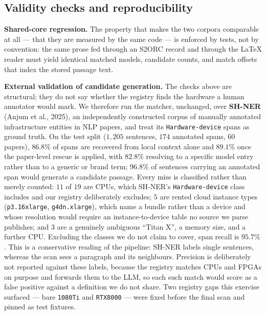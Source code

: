 \subsection{Validity checks and reproducibility}

\textbf{Shared-core regression.} The property that makes the two corpora
comparable at all --- that they are measured by the same code --- is enforced by
tests, not by convention: the same prose fed through an S2ORC record and through
the \LaTeX{} reader must yield identical matched models, candidate counts, and
match offsets that index the stored passage text.

\textbf{External validation of candidate generation.} The checks above are
structural; they do not say whether the registry finds the hardware a human
annotator would mark. We therefore run the matcher, unchanged, over
\textbf{SH-NER} (Anjum et al., 2025), an independently constructed corpus of
manually annotated infrastructure entities in NLP papers, and treat its
\texttt{Hardware-device} spans as ground truth. On the test split ($1{,}205$
sentences, $174$ annotated spans, $60$ papers), $86.8\%$ of spans are recovered
from local context alone and $89.1\%$ once the paper-level rescue is applied,
with $82.8\%$ resolving to a specific model entry rather than to a generic or
brand term; $96.8\%$ of sentences carrying an annotated span would generate a
candidate passage. Every miss is classified rather than merely counted: $11$ of
$19$ are CPUs, which SH-NER's \texttt{Hardware-device} class includes and our
registry deliberately excludes; $5$ are rented cloud instance types
(\texttt{p3.16xlarge}, \texttt{g4dn.xlarge}), which name a bundle rather than a
device and whose resolution would require an instance-to-device table no source
we parse publishes; and $3$ are a genuinely ambiguous ``Titan X'', a memory size,
and a further CPU. Excluding the classes we do not claim to cover, span recall is
$95.7\%$. This is a conservative reading of the pipeline: SH-NER labels single
sentences, whereas the scan sees a paragraph and its neighbours. Precision is
deliberately not reported against these labels, because the registry matches CPUs
and FPGAs on purpose and forwards them to the LLM, so each such match would score
as a false positive against a definition we do not share. Two registry gaps this
exercise surfaced --- bare \texttt{1080Ti} and \texttt{RTX8000} --- were fixed
before the final scan and pinned as test fixtures.

